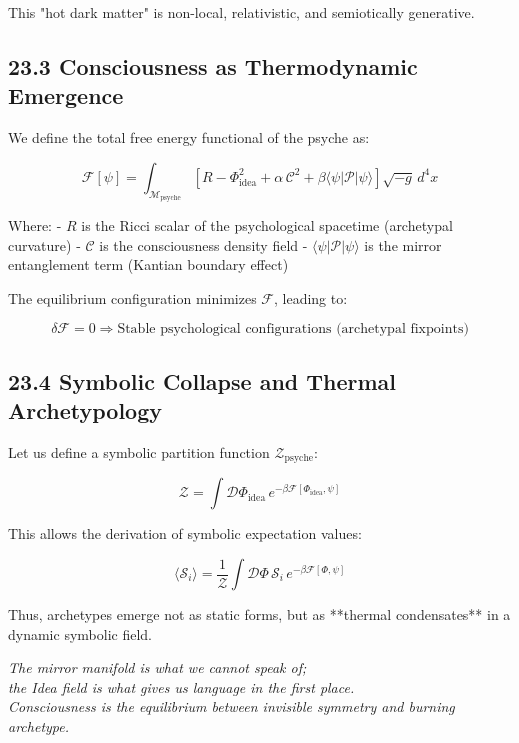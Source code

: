 \documentclass[12pt]{article}
\begin{document}
\begin{enumerate}
This "hot dark matter" is non-local, relativistic, and semiotically generative.

\subsection*{23.3 Consciousness as Thermodynamic Emergence}

We define the total free energy functional of the psyche as:

\[
\mathcal{F}[\psi] = \int_{\mathcal{M}_\text{psyche}} \left[ R - \Phi_{\text{idea}}^2 + \alpha \, \mathcal{C}^2 + \beta \langle \psi | \mathcal{P} | \psi \rangle \right] \sqrt{-g} \, d^4x
\]

Where:
- $R$ is the Ricci scalar of the psychological spacetime (archetypal curvature)
- $\mathcal{C}$ is the consciousness density field
- $\langle \psi | \mathcal{P} | \psi \rangle$ is the mirror entanglement term (Kantian boundary effect)

The equilibrium configuration minimizes $\mathcal{F}$, leading to:

\[
\delta \mathcal{F} = 0 \Rightarrow \text{Stable psychological configurations (archetypal fixpoints)}
\]

\subsection*{23.4 Symbolic Collapse and Thermal Archetypology}

Let us define a symbolic partition function $\mathcal{Z}_\text{psyche}$:

\[
\mathcal{Z} = \int \mathcal{D}\Phi_{\text{idea}} \, e^{-\beta \mathcal{F}[\Phi_{\text{idea}}, \psi]}
\]

This allows the derivation of symbolic expectation values:

\[
\langle \mathcal{S}_i \rangle = \frac{1}{\mathcal{Z}} \int \mathcal{D}\Phi \, \mathcal{S}_i \, e^{-\beta \mathcal{F}[\Phi, \psi]}
\]

Thus, archetypes emerge not as static forms, but as **thermal condensates** in a dynamic symbolic field.

\textit{
The mirror manifold is what we cannot speak of; \\
the Idea field is what gives us language in the first place. \\
Consciousness is the equilibrium between invisible symmetry and burning archetype.
}


\end{enumerate}
\end{document}
